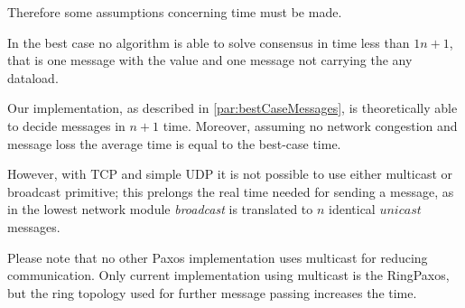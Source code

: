 Therefore some assumptions concerning time must be made.


In the best case no algorithm is able to solve consensus in time less than $1n+1$, that is one message with the value and one message not carrying the any dataload.

Our implementation, as described in \ref{par:bestCaseMessages}, is theoretically able to decide messages in $n+1$ time. Moreover, assuming no network congestion and message loss the average time is equal to the best-case time.

However, with TCP and simple UDP it is not possible to use either multicast or broadcast primitive; this prelongs the real time needed for sending a message, as in the lowest network module \emph{broadcast} is translated to $n$ identical $unicast$ messages.

Please note that no other Paxos implementation uses multicast for reducing communication. Only current implementation using multicast is the RingPaxos\cite{Mar10}, but the ring topology used for further message passing increases the time.

